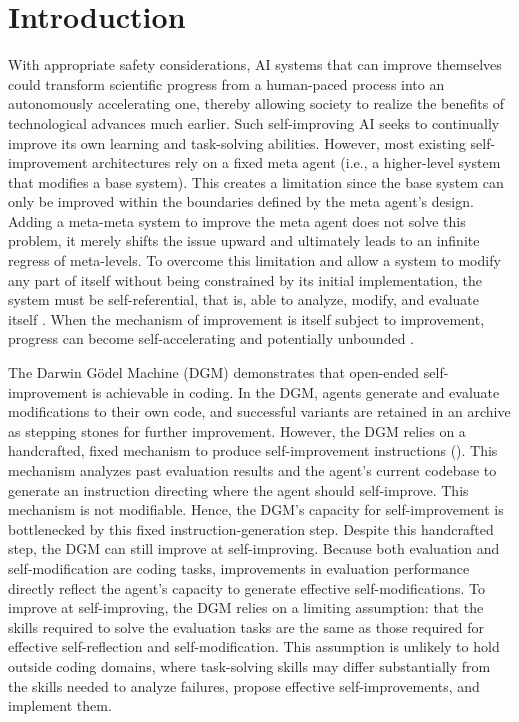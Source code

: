 \documentclass[]{fairmeta}
\title{{\ha}}
\author[1,2\dagger]{Jenny Zhang}
\author[3\dagger]{Bingchen Zhao}
\author[4\dagger]{Wannan Yang}
\author[6]{Jakob Foerster}
\author[\ddagger]{Minqi Jiang}
\author[7]{Sam Devlin}
\author[6]{Tatiana Shavrina}
\affiliation[1]{University of British Columbia}
\affiliation[2]{Vector Institute}
\affiliation[3]{University of Edinburgh}
\affiliation[5]{Canada CIFAR AI Chair}
\affiliation[6]{FAIR at Meta}
\affiliation[7]{Meta Superintelligence Labs}
\date{\today}
\begin{document}
\maketitle

\section{Introduction}
\label{sec:intro}

With appropriate safety considerations, AI systems that can improve themselves could transform scientific progress from a human-paced process into an autonomously accelerating one, thereby allowing society to realize the benefits of technological advances much earlier. Such self-improving AI seeks to continually improve its own learning and task-solving abilities. However, most existing self-improvement architectures rely on a fixed meta agent (i.e., a higher-level system that modifies a base system). This creates a limitation since the base system can only be improved within the boundaries defined by the meta agent's design. Adding a meta-meta system to improve the meta agent does not solve this problem, it merely shifts the issue upward and ultimately leads to an infinite regress of meta-levels. To overcome this limitation and allow a system to modify any part of itself without being constrained by its initial implementation, the system must be self-referential, that is, able to analyze, modify, and evaluate itself \citep{kirsch2022eliminating, zhang2025darwin}. When the mechanism of improvement is itself subject to improvement, progress can become self-accelerating and potentially unbounded \citep{lu2023arbitrary}.

The Darwin G\"odel Machine (DGM) \citep{zhang2025darwin} demonstrates that open-ended self-improvement is achievable in coding. In the DGM, agents generate and evaluate modifications to their own code, and successful variants are retained in an archive as stepping stones for further improvement. However, the DGM relies on a handcrafted, fixed mechanism to produce self-improvement instructions (). This mechanism analyzes past evaluation results and the agent's current codebase to generate an instruction directing where the agent should self-improve. This mechanism is not modifiable. Hence, the DGM's capacity for self-improvement is bottlenecked by this fixed instruction-generation step. Despite this handcrafted step, the DGM can still improve at self-improving. Because both evaluation and self-modification are coding tasks, improvements in evaluation performance directly reflect the agent's capacity to generate effective self-modifications. To improve at self-improving, the DGM relies on a limiting assumption: that the skills required to solve the evaluation tasks are the same as those required for effective self-reflection and self-modification. This assumption is unlikely to hold outside coding domains, where task-solving skills may differ substantially from the skills needed to analyze failures, propose effective self-improvements, and implement them.
\end{document}
